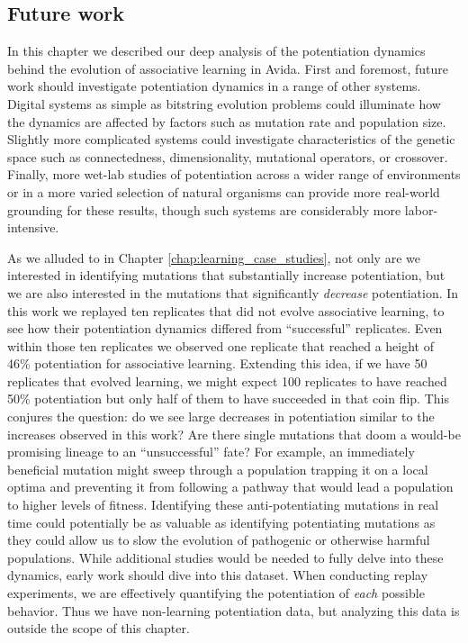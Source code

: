 \subsection{Future work}


In this chapter we described our deep analysis of the potentiation dynamics behind the evolution of associative learning in Avida. 
First and foremost, future work should investigate potentiation dynamics in a range of other systems. 
Digital systems as simple as bitstring evolution problems could illuminate how the dynamics are affected by factors such as mutation rate and population size. 
Slightly more complicated systems could investigate characteristics of the genetic space such as connectedness, dimensionality, mutational operators, or crossover.
Finally, more wet-lab studies of potentiation across a wider range of environments or in a more varied selection of natural organisms can provide more real-world grounding for these results, though such systems are considerably more labor-intensive. 

As we alluded to in Chapter \ref{chap:learning_case_studies}, not only are we interested in identifying mutations that substantially increase potentiation, but we are also interested in the mutations that significantly \textit{decrease} potentiation. 
In this work we replayed ten replicates that did not evolve associative learning, to see how their potentiation dynamics differed from ``successful'' replicates. 
Even within those ten replicates we observed one replicate that reached a height of 46\% potentiation for associative learning. 
Extending this idea, if we have 50 replicates that evolved learning, we might expect 100 replicates to have reached 50\% potentiation but only half of them to have succeeded in that coin flip. 
This conjures the question: do we see large decreases in potentiation similar to the increases observed in this work? 
Are there single mutations that doom a would-be promising lineage to an ``unsuccessful'' fate? 
For example, an immediately beneficial mutation might sweep through a population trapping it on a local optima and preventing it from following a pathway that would lead a population to higher levels of fitness.
Identifying these anti-potentiating mutations in real time could potentially be as valuable as identifying potentiating mutations as they could allow us to slow the evolution of pathogenic or otherwise harmful populations.
While additional studies would be needed to fully delve into these dynamics, early work should dive into this dataset. 
When conducting replay experiments, we are effectively quantifying the potentiation of \textit{each} possible behavior. 
Thus we have non-learning potentiation data, but analyzing this data is outside the scope of this chapter. 

